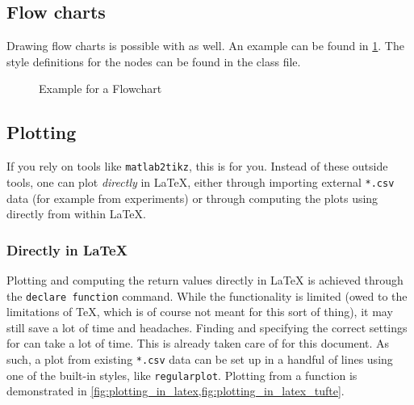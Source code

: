 \subsection{Flow charts}

Drawing flow charts is possible with  as well.
An example can be found in \cref{fig:flowchart_example}.
The style definitions for the nodes can be found in the class file.

\begin{figure}[tbp]

    \centering
    \footnotesize
    \caption{Example for a Flowchart}
    \label{fig:flowchart_example}
\end{figure}

\subsection{Plotting}

If you rely on tools like \texttt{matlab2tikz}, this is for you.
Instead of these outside tools, one can plot \emph{directly} in \LaTeX{}, either
through importing external \texttt{*.csv} data (for example from experiments)
or through computing the plots using  directly from within
\LaTeX{}.

\subsubsection{Directly in \LaTeX{}}
Plotting and computing the return values directly in \LaTeX{} is achieved through
the \texttt{declare function} command.
While the functionality is limited (owed to the limitations of \TeX{}, which is
of course not meant for this sort of thing),
it may still save a lot of time and headaches.
Finding and specifying the correct settings for  can take
a lot of time.
This is already taken care of for this document.
As such, a plot from existing \texttt{*.csv} data can be set up in a handful of
lines using one of the built-in styles, like \texttt{regularplot}.
Plotting from a  function is demonstrated in
\cref{fig:plotting_in_latex,fig:plotting_in_latex_tufte}.

